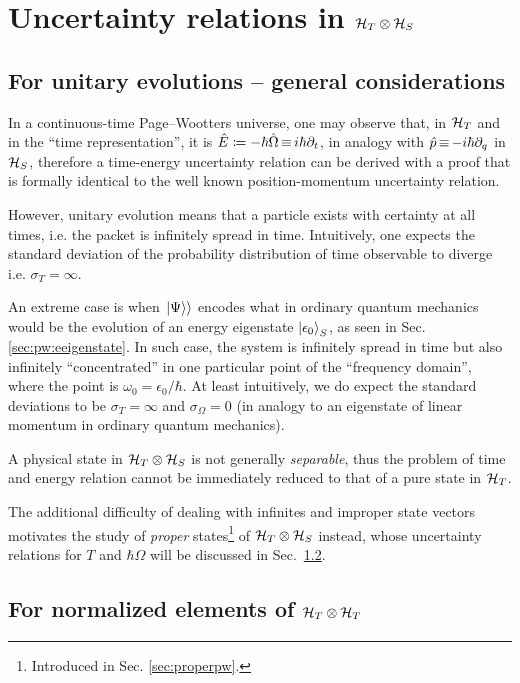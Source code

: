\section{Uncertainty relations in $\mathcal{H}_T \otimes \mathcal{H}_S$}\label{sec:pw:uncertainty}

\subsection{For unitary evolutions -- general considerations}
\label{sec:pw:unitary-general}

In a continuous-time Page--Wootters universe,
one may observe that,
in $\mathcal{H}_T$ and in the ``time representation'',
it is $\hat{E} \coloneqq -\hbar\hat{\Omega} \operatorname*{\equiv} i\hbar\partial_{t}$,
in analogy with $\hat{p} \operatorname*{\equiv} -i\hbar\partial_{q}$ in $\mathcal{H}_S$,
therefore a time-energy uncertainty relation can be derived
with a proof that is formally identical to the well known
position-momentum uncertainty relation.

However, unitary evolution means that a particle exists with
certainty at all times, i.e. the packet
is infinitely spread in time.
Intuitively,
one expects the standard deviation
of the probability distribution of time observable
to diverge i.e.
$\sigma_T = \infty$.

An extreme case is when $\left.\left| \Psi \right\rangle\right\rangle$ encodes what in ordinary quantum mechanics would be the evolution
of an energy eigenstate $\ket{\epsilon_0}_S$, as seen in Sec. \ref{sec:pw:eeigenstate}.
In such case, the system is infinitely spread in time but also infinitely
``concentrated'' in one particular point of the ``frequency domain'',
where the point is $\omega_0 = \epsilon_{0}/\hbar$.
At least intuitively, we do expect the standard deviations to be $\sigma_T = \infty$
and $\sigma_{\Omega} = 0$
(in analogy to an eigenstate of linear momentum in ordinary quantum mechanics).

A physical state in $\mathcal{H}_T \otimes \mathcal{H}_S$ is not generally
\emph{separable},
thus
the problem of time and energy relation cannot be immediately reduced to that of
a pure state in $\mathcal{H}_T$.

The additional difficulty of dealing with infinites and improper state vectors
motivates the study of \emph{proper} states\footnote{
  Introduced in Sec. \ref{sec:properpw}.
}
of $\mathcal{H}_T \otimes \mathcal{H}_S$
instead, whose uncertainty relations for $T$ and $\hbar\Omega$ will be discussed in Sec.~\ref{sec:for-normalized-elements}.

\subsection{For normalized elements of $\mathcal{H}_T \otimes \mathcal{H}_T$}\label{sec:for-normalized-elements}

